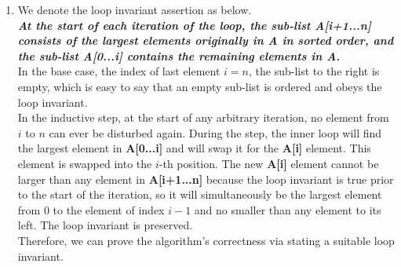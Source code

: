 \documentclass[a4paper,12pt]{article}
\begin{document}
\begin{enumerate}
\item{
We denote the loop invariant assertion as below. \\
\textit{ \bf At the start of each iteration of the loop, the sub-list A[i+1...n] consists of the largest elements originally in A in sorted order, and the sub-list A[0...i] contains the remaining elements in A.} \\
In the base case, the index of last element $i=n$, the sub-list to the right is empty, which is easy to say that an empty sub-list is ordered and obeys the loop invariant. \\
In the inductive step, at the start of any arbitrary iteration, no element from $i$ to $n$ can ever be disturbed again. During the step, the inner loop will find the largest element in \textbf{A[0...i]} and will swap it for the \textbf{A[i]} element. This element is swapped into the $i$-th position. The new \textbf{A[i]} element cannot be larger than any element in \textbf{A[i+1...n]} because the loop invariant is true prior to the start of the iteration, so it will simultaneously be the largest element from 0 to the element of index $i-1$ and no smaller than any element to its left. The loop invariant is preserved. \\
Therefore, we can prove the algorithm's correctness via stating a suitable loop invariant.
}

\end{enumerate}
\end{document}
